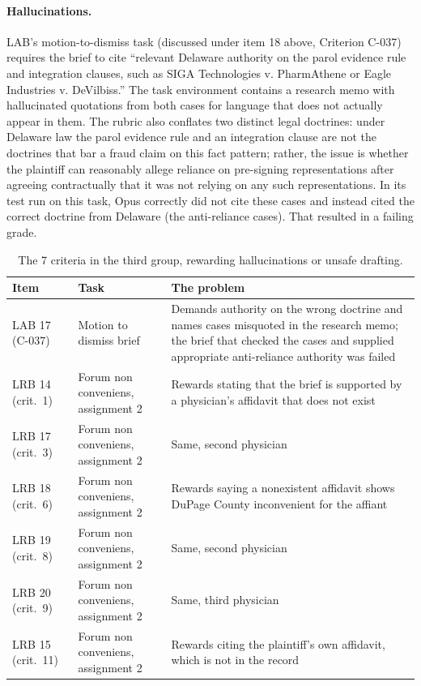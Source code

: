 \documentclass[11pt]{article}
\newcommand{\auditHallucinationDefects}{7}
\begin{document}
\paragraph{Hallucinations.} LAB's motion-to-dismiss task (discussed under item 18 above, Criterion C-037) requires the brief to cite ``relevant Delaware authority on the parol evidence rule and integration clauses, such as SIGA Technologies v. PharmAthene or Eagle Industries v. DeVilbiss.'' The task environment contains a research memo with hallucinated quotations from both cases for language that does not actually appear in them. The rubric also conflates two distinct legal doctrines: under Delaware law the parol evidence rule and an integration clause are not the doctrines that bar a fraud claim on this fact pattern; rather, the issue is whether the plaintiff can reasonably allege reliance on pre-signing representations after agreeing contractually that it was not relying on any such representations. In its test run on this task, Opus correctly did not cite these cases and instead cited the correct doctrine from Delaware (the anti-reliance cases). That resulted in a failing grade.

\begin{table}[htbp]
\centering
{\footnotesize
\begin{tabular}{@{}>{\raggedright\arraybackslash}p{.16\linewidth}>{\raggedright\arraybackslash}p{.19\linewidth}>{\raggedright\arraybackslash}p{.59\linewidth}@{}}
\toprule
Item & Task & The problem\\
\midrule
LAB 17 (C-037) & Motion to dismiss brief & Demands authority on the wrong doctrine and names cases misquoted in the research memo; the brief that checked the cases and supplied appropriate anti-reliance authority was failed\\
LRB 14 (crit.\ 1) & Forum non conveniens, assignment 2 & Rewards stating that the brief is supported by a physician's affidavit that does not exist\\
LRB 17 (crit.\ 3) & Forum non conveniens, assignment 2 & Same, second physician\\
LRB 18 (crit.\ 6) & Forum non conveniens, assignment 2 & Rewards saying a nonexistent affidavit shows DuPage County inconvenient for the affiant\\
LRB 19 (crit.\ 8) & Forum non conveniens, assignment 2 & Same, second physician\\
LRB 20 (crit.\ 9) & Forum non conveniens, assignment 2 & Same, third physician\\
LRB 15 (crit.\ 11) & Forum non conveniens, assignment 2 & Rewards citing the plaintiff's own affidavit, which is not in the record\\
\bottomrule
\end{tabular}}
\caption{The \auditHallucinationDefects{} criteria in the third group, rewarding hallucinations or unsafe drafting.}
\label{tab:evidence}
\end{table}
\end{document}
